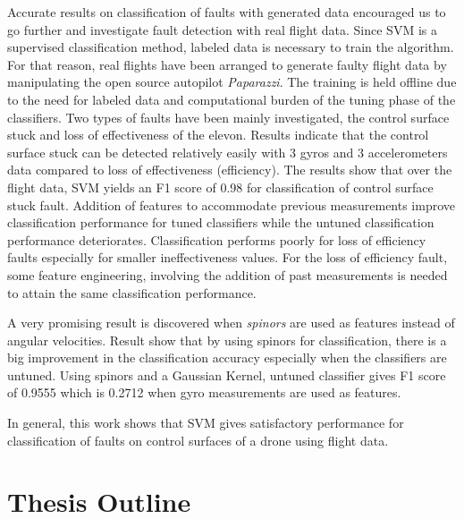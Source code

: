 Accurate results on classification of faults with generated data encouraged us to go further and investigate fault detection with real flight data. 
Since SVM is a supervised classification method, labeled data is necessary to train the algorithm. For that reason, real flights have been arranged to generate faulty flight data by manipulating the open source autopilot \emph{Paparazzi}.  
The training is held offline due to the need for labeled data and computational burden of the tuning phase of the classifiers. 
Two types of faults have been mainly investigated, the control surface stuck and loss of effectiveness of the elevon. Results indicate that the control surface stuck can be detected relatively easily with 3 gyros and 3 accelerometers data compared to loss of effectiveness (efficiency). 
The results show that over the flight data, SVM yields an F1 score of 0.98 for classification of control surface stuck fault. 
Addition of features to accommodate previous measurements improve classification performance for tuned classifiers while the untuned classification performance deteriorates. 
Classification performs poorly for loss of efficiency faults especially for smaller ineffectiveness values. 
For the loss of efficiency fault, some feature engineering, involving the addition of past measurements is needed to attain the same classification performance.

A very promising result is discovered when \emph{spinors} are used as features instead of angular velocities. 
Result show that by using spinors for classification, there is a big improvement in the classification accuracy especially when the classifiers are untuned. Using spinors and a Gaussian Kernel, untuned classifier gives F1 score of 0.9555 which is 0.2712 when gyro measurements are used as features.

In general, this work shows that SVM gives satisfactory performance for classification of faults on control surfaces of a drone using flight data.

\section{Thesis Outline}


